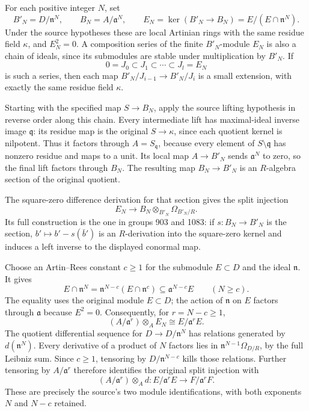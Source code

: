 For each positive integer \(N\), set \[
B'_N=D/\mathfrak n^N,\qquad
B_N=A/\mathfrak a^N,\qquad
E_N=\ker(B'_N\to B_N)=E/(E\cap\mathfrak n^N).
\] Under the source hypotheses these are local Artinian rings with the same residue field \(\kappa\), and \(E_N^2=0\). A composition series of the finite \(B'_N\)-module \(E_N\) is also a chain of ideals, since its submodules are stable under multiplication by \(B'_N\). If \[
0=J_0\subset J_1\subset\cdots\subset J_l=E_N
\] is such a series, then each map \(B'_N/J_{i-1}\to B'_N/J_i\) is a small extension, with exactly the same residue field \(\kappa\).

Starting with the specified map \(S\to B_N\), apply the source lifting hypothesis in reverse order along this chain. Every intermediate lift has maximal-ideal inverse image \(\mathfrak q\): its residue map is the original \(S\to\kappa\), since each quotient kernel is nilpotent. Thus it factors through \(A=S_{\mathfrak q}\), because every element of \(S\setminus\mathfrak q\) has nonzero residue and maps to a unit. Its local map \(A\to B'_N\) sends \(\mathfrak a^N\) to zero, so the final lift factors through \(B_N\). The resulting map \(B_N\to B'_N\) is an \(R\)-algebra section of the original quotient.

The square-zero difference derivation for that section gives the split injection \[
E_N\longrightarrow B_N\otimes_{B'_N}\Omega_{B'_N/R}.
\] Its full construction is the one in groups 903 and 1083: if \(s:B_N\to B'_N\) is the section, \(b'\mapsto b'-s(\bar b')\) is an \(R\)-derivation into the square-zero kernel and induces a left inverse to the displayed conormal map.

Choose an Artin--Rees constant \(c\ge1\) for the submodule \(E\subset D\) and the ideal \(\mathfrak n\). It gives \[
E\cap\mathfrak n^N
=\mathfrak n^{N-c}(E\cap\mathfrak n^c)
\subseteq\mathfrak a^{N-c}E\qquad(N\ge c).
\] The equality uses the original module \(E\subset D\); the action of \(\mathfrak n\) on \(E\) factors through \(\mathfrak a\) because \(E^2=0\). Consequently, for \(r=N-c\ge1\), \[
(A/\mathfrak a^r)\otimes_A E_N
\cong E/\mathfrak a^rE.
\] The quotient differential sequence for \(D\to D/\mathfrak n^N\) has relations generated by \(d(\mathfrak n^N)\). Every derivative of a product of \(N\) factors lies in \(\mathfrak n^{N-1}\Omega_{D/R}\), by the full Leibniz sum. Since \(c\ge1\), tensoring by \(D/\mathfrak n^{N-c}\) kills those relations. Further tensoring by \(A/\mathfrak a^r\) therefore identifies the original split injection with \[
(A/\mathfrak a^r)\otimes_A d:
E/\mathfrak a^rE\longrightarrow F/\mathfrak a^rF.
\] These are precisely the source's two module identifications, with both exponents \(N\) and \(N-c\) retained.

